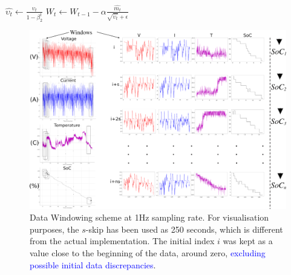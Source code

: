 {\begin{algorithm}
\begin{algorithmic}[1]
        \STATE $\hat{\upsilon_t} \gets \frac{\upsilon_t}{1-\beta^t_2} $ 
        \STATE $W_t \gets W_{t-1}- \alpha \frac{\hat{m_t}}{\sqrt{\hat{\upsilon_t}}+\epsilon} $ 
        \ENDWHILE
    \end{algorithmic}
    \label{alg:copyAdam}
\end{algorithm}
\begin{table}[htbp]
    \renewcommand{\arraystretch}{1.3}
    \caption{Optimiser Hyper-Parameters}
    \centering
    \label{tab:newM-params}
\end{table}
}
\begin{landscape}
    \begin{figure}[t]
        \centering
        \includegraphics[width=\linewidth]{II_Body/images/Windowing4f-A3.jpg}
        \caption{Data Windowing scheme at 1Hz sampling rate. For visualisation purposes, the $s$-skip has been used as 250 seconds, which is different from the actual implementation. The initial index $i$ was kept as a value close to the beginning of the data, around zero, \textcolor{blue}{excluding possible initial data discrepancies}.}
        \label{fig:Windowing}
    \end{figure}
\end{landscape}